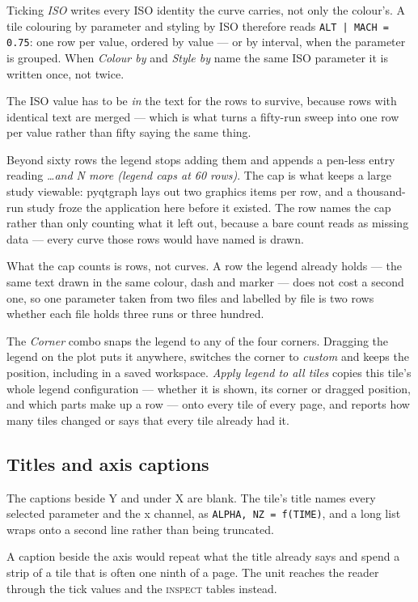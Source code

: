 \documentclass[11pt,a4paper,oneside]{report}
\newcommand{\code}[1]{\texttt{#1}}
\newcommand{\tab}[1]{\textsc{#1}}
\begin{document}
Ticking \emph{ISO} writes every ISO identity the curve carries, not only the
colour's. A tile colouring by parameter and styling by ISO therefore reads
\code{ALT | MACH = 0.75}: one row per value, ordered by value --- or by
interval, when the parameter is grouped. When \emph{Colour by} and \emph{Style
by} name the same ISO parameter it is written once, not twice.

The ISO value has to be \emph{in} the text for the rows to survive, because
rows with identical text are merged --- which is what turns a fifty-run sweep
into one row per value rather than fifty saying the same thing.

Beyond sixty rows the legend stops adding them and appends a pen-less entry
reading \emph{\ldots and N more (legend caps at 60 rows)}. The cap is what
keeps a large study viewable: pyqtgraph lays out two graphics items per row, and
a thousand-run study froze the application here before it existed. The row names
the cap rather than only counting what it left out, because a bare count reads
as missing data --- every curve those rows would have named is drawn.

What the cap counts is rows, not curves. A row the legend already holds ---
the same text drawn in the same colour, dash and marker --- does not cost a
second one, so one parameter taken from two files and labelled by file is two
rows whether each file holds three runs or three hundred.

The \emph{Corner} combo snaps the legend to any of the four corners. Dragging the
legend on the plot puts it anywhere, switches the corner to \emph{custom} and
keeps the position, including in a saved workspace. \emph{Apply legend to all
tiles} copies this tile's whole legend configuration --- whether it is shown, its
corner or dragged position, and which parts make up a row --- onto every tile of
every page, and reports how many tiles changed or says that every tile already
had it.

\subsection{Titles and axis captions}

The captions beside Y and under X are blank. The tile's title names every
selected parameter and the x channel, as \code{ALPHA, NZ = f(TIME)}, and a long
list wraps onto a second line rather than being truncated.

A caption beside the axis would repeat what the title already says and spend a
strip of a tile that is often one ninth of a page. The unit reaches the reader
through the tick values and the \tab{inspect} tables instead.
\end{document}
